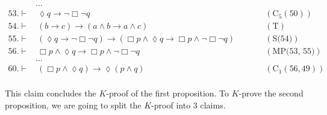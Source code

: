 \documentclass[a4paper, 12pt]{report}
\begin{document}
{{\begin{equation*}
\begin{alignedat}{2}
                               & \ldots && \\
                    53. \vdash & \ \lozenge q \to \lnot \Box \lnot q && \quad \quad (\mbox{C}_5(50)) \\
                    54. \vdash & \ (b \to c) \to (a \land b \to a \land c) && \quad \quad (\mbox{T}) \\
                    55. \vdash & \ (\lozenge q \to \lnot \Box \lnot q) \to (\Box p \land \lozenge q \to \Box p \land \lnot \Box \lnot q) && \quad \quad (\mbox{S(54)}) \\
                    56. \vdash & \ \Box p \land \lozenge q \to \Box p \land \lnot \Box \lnot q && \quad \quad (\mbox{MP(53, 55)}) \\
                               & \ldots && \\
                    60. \vdash & \ (\Box p \land \lozenge q) \to \lozenge (p \land q) && \quad \quad (\mbox{C}_1(56, 49)) \\
                \end{alignedat}
            \end{equation*}
        }

        This claim concludes the $K$-proof of the first proposition. To $K$-prove the second proposition, we are going to split the $K$-proof into 3 claims.

        }
\end{document}
